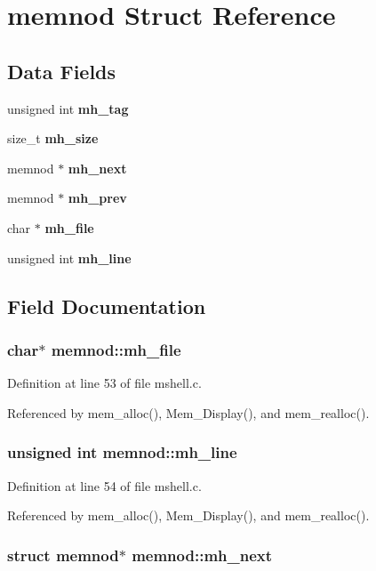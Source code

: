\section{memnod Struct Reference}
\label{structmemnod}
\subsection*{Data Fields}
\begin{CompactItemize}
\item 
unsigned int {\bf mh\_\-tag}
\item 
size\_\-t {\bf mh\_\-size}
\item 
memnod $\ast$ {\bf mh\_\-next}
\item 
memnod $\ast$ {\bf mh\_\-prev}
\item 
char $\ast$ {\bf mh\_\-file}
\item 
unsigned int {\bf mh\_\-line}
\end{CompactItemize}


\subsection{Field Documentation}
\subsubsection{\setlength{\rightskip}{0pt plus 5cm}char$\ast$ memnod::mh\_\-file}\label{structmemnod_m4}




Definition at line 53 of file mshell.c.

Referenced by mem\_\-alloc(), Mem\_\-Display(), and mem\_\-realloc().
\subsubsection{\setlength{\rightskip}{0pt plus 5cm}unsigned int memnod::mh\_\-line}\label{structmemnod_m5}




Definition at line 54 of file mshell.c.

Referenced by mem\_\-alloc(), Mem\_\-Display(), and mem\_\-realloc().
\subsubsection{\setlength{\rightskip}{0pt plus 5cm}struct memnod$\ast$ memnod::mh\_\-next}\label{structmemnod_m2}




